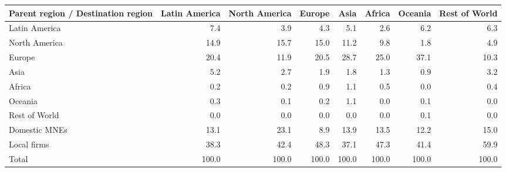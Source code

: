\begin{tabular}{lrrrrrrr}
\toprule
Parent region / Destination region & Latin America & North America & Europe & Asia & Africa & Oceania & Rest of World \\
\midrule
Latin America & 7.4 & 3.9 & 4.3 & 5.1 & 2.6 & 6.2 & 6.3 \\
North America & 14.9 & 15.7 & 15.0 & 11.2 & 9.8 & 1.8 & 4.9 \\
Europe & 20.4 & 11.9 & 20.5 & 28.7 & 25.0 & 37.1 & 10.3 \\
Asia & 5.2 & 2.7 & 1.9 & 1.8 & 1.3 & 0.9 & 3.2 \\
Africa & 0.2 & 0.2 & 0.9 & 1.1 & 0.5 & 0.0 & 0.4 \\
Oceania & 0.3 & 0.1 & 0.2 & 1.1 & 0.0 & 0.1 & 0.0 \\
Rest of World & 0.0 & 0.0 & 0.0 & 0.0 & 0.0 & 0.1 & 0.0 \\
Domestic MNEs & 13.1 & 23.1 & 8.9 & 13.9 & 13.5 & 12.2 & 15.0 \\
Local firms & 38.3 & 42.4 & 48.3 & 37.1 & 47.3 & 41.4 & 59.9 \\
\midrule
Total & 100.0 & 100.0 & 100.0 & 100.0 & 100.0 & 100.0 & 100.0 \\
\bottomrule
\end{tabular}
